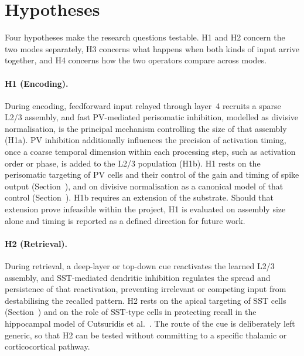 \section{Hypotheses}
\label{sec:aims-hypotheses}

Four hypotheses make the research questions testable. H1 and H2 concern the
two modes separately, H3 concerns what happens when both kinds of input arrive
together, and H4 concerns how the two operators compare across modes.

\paragraph{H1 (Encoding).} During encoding, feedforward input relayed through
layer~4 recruits a sparse L2/3 assembly, and fast PV-mediated perisomatic
inhibition, modelled as divisive normalisation, is the principal mechanism
controlling the size of that assembly (H1a). PV inhibition additionally
influences the precision of activation timing, once a coarse temporal
dimension within each processing step, such as activation order or phase, is
added to the L2/3 population (H1b). H1 rests on the perisomatic targeting of PV
cells and their control of the gain and timing of spike output
(Section~), and on divisive normalisation as a
canonical model of that control (Section~).
H1b requires an extension of the substrate. Should that extension prove
infeasible within the project, H1 is evaluated on assembly size alone and
timing is reported as a defined direction for future work.

\paragraph{H2 (Retrieval).} During retrieval, a deep-layer or top-down cue
reactivates the learned L2/3 assembly, and SST-mediated dendritic inhibition
regulates the spread and persistence of that reactivation, preventing
irrelevant or competing input from destabilising the recalled pattern. H2 rests
on the apical targeting of SST cells (Section~) and on
the role of SST-type cells in protecting recall in the hippocampal
model of Cutsuridis et al.~\cite{cutsuridis2010encoding}. The route of the cue is
deliberately left generic, so that H2 can be tested without committing to a
specific thalamic or corticocortical pathway.

